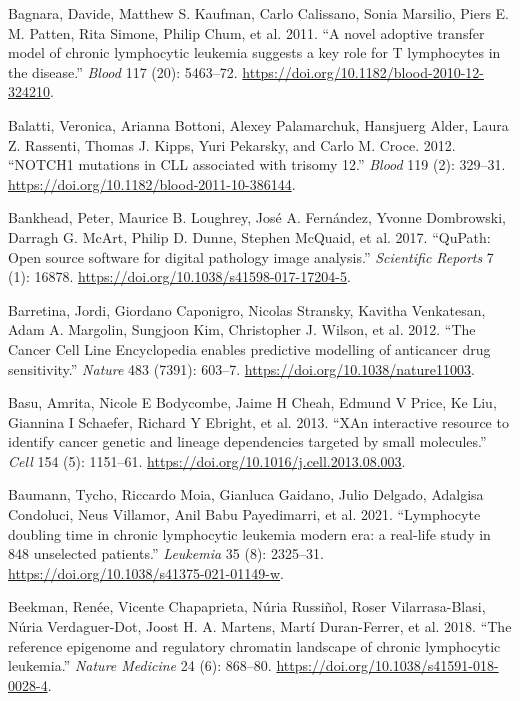 \documentclass[11pt, a4paper, twosided]{book}
\newenvironment{CSLReferences}%
  {}%
  {\par}
\begin{document}
\begin{CSLReferences}{1}{0}
\leavevmode{}%
Bagnara, Davide, Matthew S. Kaufman, Carlo Calissano, Sonia Marsilio, Piers E. M. Patten, Rita Simone, Philip Chum, et al. 2011. {``{A novel adoptive transfer model of chronic lymphocytic leukemia suggests a key role for T lymphocytes in the disease}.''} \emph{Blood} 117 (20): 5463--72. \url{https://doi.org/10.1182/blood-2010-12-324210}.

\leavevmode{}%
Balatti, Veronica, Arianna Bottoni, Alexey Palamarchuk, Hansjuerg Alder, Laura Z. Rassenti, Thomas J. Kipps, Yuri Pekarsky, and Carlo M. Croce. 2012. {``{NOTCH1 mutations in CLL associated with trisomy 12}.''} \emph{Blood} 119 (2): 329--31. \url{https://doi.org/10.1182/blood-2011-10-386144}.

\leavevmode{}%
Bankhead, Peter, Maurice B. Loughrey, José A. Fernández, Yvonne Dombrowski, Darragh G. McArt, Philip D. Dunne, Stephen McQuaid, et al. 2017. {``{QuPath: Open source software for digital pathology image analysis}.''} \emph{Scientific Reports} 7 (1): 16878. \url{https://doi.org/10.1038/s41598-017-17204-5}.

\leavevmode{}%
Barretina, Jordi, Giordano Caponigro, Nicolas Stransky, Kavitha Venkatesan, Adam A. Margolin, Sungjoon Kim, Christopher J. Wilson, et al. 2012. {``{The Cancer Cell Line Encyclopedia enables predictive modelling of anticancer drug sensitivity}.''} \emph{Nature} 483 (7391): 603--7. \url{https://doi.org/10.1038/nature11003}.

\leavevmode{}%
Basu, Amrita, Nicole E Bodycombe, Jaime H Cheah, Edmund V Price, Ke Liu, Giannina I Schaefer, Richard Y Ebright, et al. 2013. {``{XAn interactive resource to identify cancer genetic and lineage dependencies targeted by small molecules}.''} \emph{Cell} 154 (5): 1151--61. \url{https://doi.org/10.1016/j.cell.2013.08.003}.

\leavevmode{}%
Baumann, Tycho, Riccardo Moia, Gianluca Gaidano, Julio Delgado, Adalgisa Condoluci, Neus Villamor, Anil Babu Payedimarri, et al. 2021. {``{Lymphocyte doubling time in chronic lymphocytic leukemia modern era: a real-life study in 848 unselected patients}.''} \emph{Leukemia} 35 (8): 2325--31. \url{https://doi.org/10.1038/s41375-021-01149-w}.

\leavevmode{}%
Beekman, Renée, Vicente Chapaprieta, Núria Russiñol, Roser Vilarrasa-Blasi, Núria Verdaguer-Dot, Joost H. A. Martens, Martí Duran-Ferrer, et al. 2018. {``{The reference epigenome and regulatory chromatin landscape of chronic lymphocytic leukemia}.''} \emph{Nature Medicine} 24 (6): 868--80. \url{https://doi.org/10.1038/s41591-018-0028-4}.


\end{CSLReferences}
\end{document}
